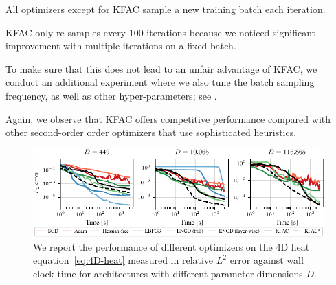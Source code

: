 
All optimizers except for KFAC sample a new training batch each iteration.

KFAC only re-samples every 100 iterations because we noticed  significant improvement with multiple iterations on a fixed batch.

To make sure that this does not lead to an unfair advantage of KFAC, we conduct an additional experiment where we also tune the batch sampling frequency, as well as other hyper-parameters; see .

Again, we observe that KFAC offers competitive performance compared with other second-order order optimizers that use sophisticated heuristics.
\begin{figure}
  \centering
  \includegraphics{../kfac_pinns_exp/exp30_heat4d_groupplot/l2_error_over_time.pdf}
  \caption{We report the performance of different optimizers on the 4D heat equation~\eqref{eq:4D-heat} measured in relative $L^2$ error against wall clock time for architectures with different parameter dimensions $D$.}
  \label{fig:4D-heat}
\end{figure}


